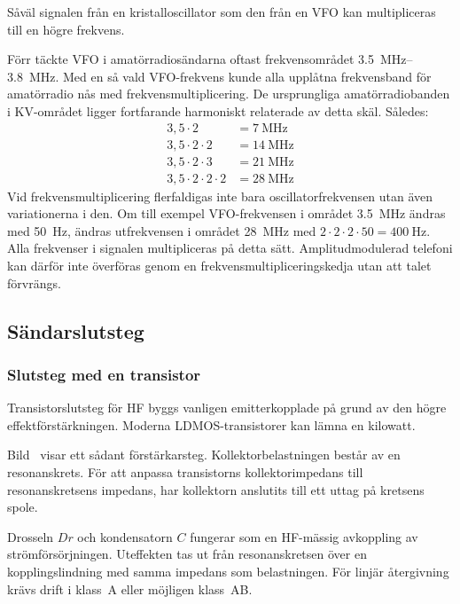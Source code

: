 Såväl signalen från en kristalloscillator som den från en VFO kan
multipliceras till en högre frekvens.

Förr täckte VFO i amatörradiosändarna oftast frekvensområdet
\SIrange{3,5}{3,8}{\mega\hertz}.
Med en så vald VFO-frekvens kunde alla upplåtna frekvensband för
amatörradio nås med frekvensmultiplicering.
De ursprungliga amatörradiobanden i KV-området ligger fortfarande harmoniskt
relaterade av detta skäl. Således:
\begin{align*}
  3,5 \cdot 2 & = \qty{7}{\mega\hertz} \\
  3,5 \cdot 2 \cdot 2 & = \qty{14}{\mega\hertz} \\
  3,5 \cdot 2 \cdot 3 & = \qty{21}{\mega\hertz} \\
  3,5 \cdot 2 \cdot 2 \cdot 2 & = \qty{28}{\mega\hertz}
\end{align*}
Vid frekvensmultiplicering flerfaldigas inte bara oscillatorfrekvensen utan
även variationerna i den.
Om till exempel VFO-frekvensen i området \qty{3,5}{\mega\hertz} ändras med
\qty{50}{\hertz}, ändras utfrekvensen i området \qty{28}{\mega\hertz} med
\(2 \cdot 2 \cdot 2 \cdot 50 = \qty{400}{\hertz}\).
Alla frekvenser i signalen multipliceras på detta sätt.
Amplitudmodulerad telefoni kan därför inte överföras genom en
frekvensmultipliceringskedja utan att talet förvrängs.

\subsection{Sändarslutsteg}

\subsubsection{Slutsteg med en transistor}


Transistorslutsteg för HF byggs vanligen emitterkopplade på grund av den
högre effektförstärkningen.
Moderna LDMOS-transistorer kan lämna en kilowatt.

Bild~ visar ett sådant förstärkarsteg.
Kollektorbelastningen består av en resonanskrets.
För att anpassa transistorns kollektorimpedans till resonanskretsens
impedans, har kollektorn anslutits till ett uttag på kretsens spole.

Drosseln \(Dr\) och kondensatorn \(C\) fungerar som en HF-mässig avkoppling av
strömförsörjningen.
Uteffekten tas ut från resonanskretsen över en kopplingslindning med samma
impedans som belastningen.
För linjär återgivning krävs drift i klass~A eller möjligen klass~AB.

